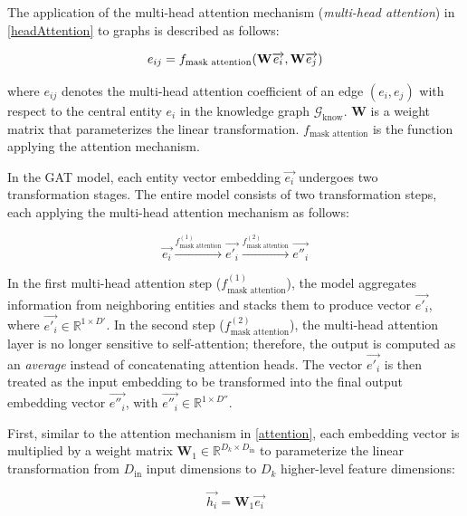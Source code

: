 The application of the multi-head attention mechanism (\textit{multi-head attention}) in \ref{headAttention} to graphs is described as follows:

\begin{equation}
	\label{maskAttention}
	\centering
	{e_{ij}}={f_{\text{mask attention}}(\mathbf{W} \overrightarrow{e_i}, \mathbf{W} \overrightarrow{e_j})}
\end{equation}

where $e_{ij}$ denotes the multi-head attention coefficient of an edge $(e_i, e_j)$ with respect to the central entity $e_i$ in the knowledge graph $\mathcal{G}_{\text{know}}$. $\mathbf{W}$ is a weight matrix that parameterizes the linear transformation. $f_{\text{mask attention}}$ is the function applying the attention mechanism.

In the GAT model, each entity vector embedding $\overrightarrow{e_i}$ undergoes two transformation stages. The entire model consists of two transformation steps, each applying the multi-head attention mechanism as follows:

\begin{equation}
	\label{gatProcess}
	\overrightarrow{e_i} \xrightarrow{f_{\text{mask attention}}^{(1)}} \overrightarrow{e'_i} \xrightarrow{f_{\text{mask attention}}^{(2)}} \overrightarrow{e''_i}
\end{equation}

In the first multi-head attention step ($f_{\text{mask attention}}^{(1)}$), the model aggregates information from neighboring entities and stacks them to produce vector $\overrightarrow{e'_i}$, where $\overrightarrow{e'_i} \in \mathbb{R}^{1 \times D'}$. In the second step ($f_{\text{mask attention}}^{(2)}$), the multi-head attention layer is no longer sensitive to self-attention; therefore, the output is computed as an \textit{average} instead of concatenating attention heads. The vector $\overrightarrow{e'_i}$ is then treated as the input embedding to be transformed into the final output embedding vector $\overrightarrow{e''_i}$, with $\overrightarrow{e''_i} \in \mathbb{R}^{1 \times D''}$.

First, similar to the attention mechanism in \ref{attention}, each embedding vector is multiplied by a weight matrix $\mathbf{W}_1 \in \mathbb{R}^{D_k \times D_{\text{in}}}$ to parameterize the linear transformation from $D_{\text{in}}$ input dimensions to $D_k$ higher-level feature dimensions:

\begin{equation}
	\overrightarrow{h_i} = \mathbf{W}_{1} \overrightarrow{e_i}
\end{equation}

